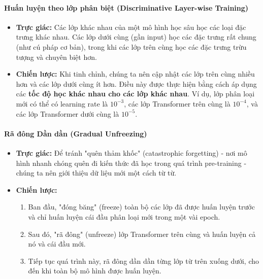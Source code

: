 \paragraph{Huấn luyện theo lớp phân biệt (Discriminative Layer-wise Training)}
\begin{itemize}
    \item \textbf{Trực giác:} Các lớp khác nhau của một mô hình học sâu học các loại đặc trưng khác nhau. Các lớp dưới cùng (gần input) học các đặc trưng rất chung (như cú pháp cơ bản), trong khi các lớp trên cùng học các đặc trưng trừu tượng và chuyên biệt hơn.
    \item \textbf{Chiến lược:} Khi tinh chỉnh, chúng ta nên cập nhật các lớp trên cùng nhiều hơn và các lớp dưới cùng ít hơn. Điều này được thực hiện bằng cách áp dụng các \textbf{tốc độ học khác nhau cho các lớp khác nhau}. Ví dụ, lớp phân loại mới có thể có learning rate là $10^{-3}$, các lớp Transformer trên cùng là $10^{-4}$, và các lớp Transformer dưới cùng là $10^{-5}$.
\end{itemize}

\paragraph{Rã đông Dần dần (Gradual Unfreezing)}
\begin{itemize}
    \item \textbf{Trực giác:} Để tránh "quên thảm khốc" (catastrophic forgetting) - nơi mô hình nhanh chóng quên đi kiến thức đã học trong quá trình pre-training - chúng ta nên giới thiệu dữ liệu mới một cách từ từ.
    \item \textbf{Chiến lược:}
        \begin{enumerate}
            \item Ban đầu, "đóng băng" (freeze) toàn bộ các lớp đã được huấn luyện trước và chỉ huấn luyện cái đầu phân loại mới trong một vài epoch.
            \item Sau đó, "rã đông" (unfreeze) lớp Transformer trên cùng và huấn luyện cả nó và cái đầu mới.
            \item Tiếp tục quá trình này, rã đông dần dần từng lớp từ trên xuống dưới, cho đến khi toàn bộ mô hình được huấn luyện.
        \end{enumerate}
\end{itemize}

